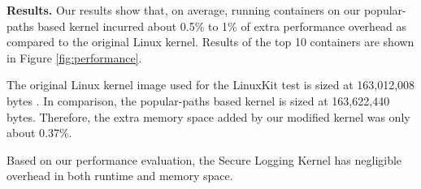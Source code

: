 \textbf{Results.}
Our results show that, on average, running containers on our popular-paths based kernel incurred about 0.5\% to 1\% of extra performance overhead as compared to the original Linux kernel. Results of the top 10 containers are shown in Figure \ref{fig:performance}.

The original Linux kernel image used for the  LinuxKit test  is sized at 163,012,008 bytes . 
In comparison, the popular-paths based kernel is sized at 163,622,440 bytes. Therefore, the extra memory space added by our modified kernel was only about 0.37\%. 

Based on our performance evaluation, the Secure Logging Kernel has negligible overhead in both runtime and memory space. 